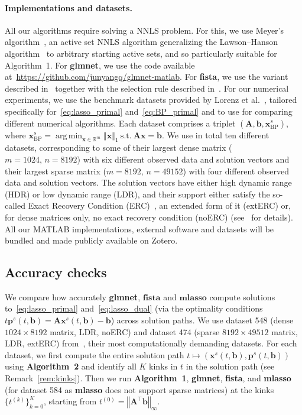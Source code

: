 \documentclass[11pt]{article}
\numberwithin{prop}{section}
\numberwithin{lem}{section}
\numberwithin{rem}{section}
\numberwithin{cor}{section}
\numberwithin{thm}{section}
\numberwithin{defn}{section}
\numberwithin{fact}{section}
\theoremstyle{plain}
\def\bb {\boldsymbol{b}}
\def\bp {\boldsymbol{p}}
\def\bx {\boldsymbol{x}}
\def\R {\mathbb{R}}
\newcommand{\normone}[1]{\left\Vert{#1} \right\Vert_{1}}
\newcommand{\norminf}[1]{\left\Vert{#1} \right\Vert_{\infty}}
\newcommand{\matr}[1]{\bm{#1}}
\def\Rm {\R^m}
\DeclareMathOperator*{\argmin}{arg\,min}
\def\Atop {\matr{A}^{\top}}
\begin{document}
\paragraph{Implementations and datasets.} All our algorithms require solving a NNLS problem. For this, we use Meyer's algorithm~\cite{meyer2013simple}, an active set NNLS algorithm generalizing the Lawson--Hanson algorithm~\cite{lawson1995solving} to arbitrary starting active sets, and so particularly suitable for Algorithm~1. For \textbf{glmnet}, we use the code available at~\url{https://github.com/junyangq/glmnet-matlab}. For \textbf{fista}, we use the variant described in~\cite[Algorithm 5, Page 197]{chambolle2016introduction} together with the selection rule described in~\cite[Equation 7]{tibshirani2012strong}. For our numerical experiments, we use the benchmark datasets provided by Lorenz et al.~\cite[Tables 1-2, Section 4]{lorenz2015solving}, tailored specifically for~\eqref{eq:lasso_primal} and~\eqref{eq:BP_primal} and to use for comparing different numerical algorithms. Each dataset comprises a triplet $(\matr{A},\bb,\bx_{\text{BP}}^{s})$, where $\bx_{\text{BP}}^{s} = \argmin_{\bx \in \Rm}\normone{\bx} \ \text{s.t.} \ \matr{A}\bx=\bb$. We use in total ten different datasets, corresponding to some of their largest dense matrix ($m = 1024,\, n = 8192$) with six different observed data and solution vectors and their largest sparse matrix ($m = 8192,\, n = 49152$) with four different observed data and solution vectors. The solution vectors have either high dynamic range (HDR) or low dynamic range (LDR), and their support either satisfy the so-called Exact Recovery Condition (ERC)~\cite{tropp2006just}, an extended form of it (extERC) or, for dense matrices only, no exact recovery condition (noERC) (see~\cite{lorenz2015solving} for details). All our MATLAB implementations, external software and datasets will be bundled and made publicly available on Zotero.


\subsection{Accuracy checks}\label{subsec:numerics_accuracy}
We compare how accurately \textbf{glmnet}, $\textbf{fista}$ and $\textbf{mlasso}$ compute solutions to~\eqref{eq:lasso_primal} and~\eqref{eq:lasso_dual} (via the optimality conditions $t\bp^{s}(t,\bb) = \matr{A}\bx^{s}(t,\bb)-\bb$) across solution paths. We use dataset 548 (dense $1024\times 8192$ matrix, LDR, noERC) and dataset 474 (sparse $8192 \times 49512$ matrix, LDR, extERC) from~\cite{lorenz2015solving}, their most computationally demanding datasets. For each dataset, we first compute the entire solution path $t \mapsto (\bx^{s}(t,\bb),\bp^{s}(t,\bb))$ using \textbf{Algorithm~2} and identify all $K$ kinks in $t$ in the solution path (see Remark~\ref{rem:kinks}). Then we run \textbf{Algorithm~1}, \textbf{glmnet}, \textbf{fista}, and \textbf{mlasso} (for dataset 584 as \textbf{mlasso} does not support sparse matrices) at the kinks $\{t^{(k)}\}_{k=0}^{K}$, starting from $t^{(0)} = \norminf{\Atop\bb}$.
\end{document}
